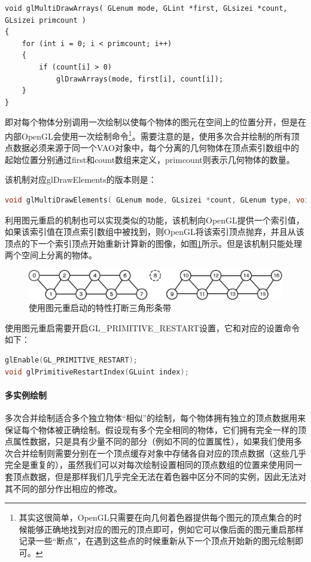 \begin{lstlisting}
void glMultiDrawArrays( GLenum mode, GLint *first, GLsizei *count, GLsizei primcount )
{
	for (int i = 0; i < primcount; i++)
	{
		if (count[i] > 0)
			glDrawArrays(mode, first[i], count[i]);
	}
}
\end{lstlisting}

即对每个物体分别调用一次绘制以使每个物体的图元在空间上的位置分开，但是在内部OpenGL会使用一次绘制命令\footnote{其实这很简单，OpenGL只需要在向几何着色器提供每个图元的顶点集合的时候能够正确地找到对应的图元的顶点即可，例如它可以像后面的图元重启那样记录一些“断点”，在遇到这些点的时候重新从下一个顶点开始新的图元绘制即可。}。需要注意的是，使用多次合并绘制的所有顶点数据必须来源于同一个VAO对象中，每个分离的几何物体在顶点索引数组中的起始位置分别通过first和count数组来定义，primcount则表示几何物体的数量。

该机制对应glDrawElements的版本则是：

\begin{lstlisting}[language=C++]
void glMultiDrawElements​( GLenum mode​, GLsizei *count​, GLenum type​, void **indices​, GLsizei primcount​ );
\end{lstlisting}

利用图元重启的机制也可以实现类似的功能，该机制向OpenGL提供一个索引值，如果该索引值在顶点索引数组中被找到，则OpenGL将该索引顶点抛弃，并且从该顶点的下一个索引顶点开始重新计算新的图像，如图\ref{f:api-primitive-restart}所示。但是该机制只能处理两个空间上分离的物体。

\begin{figure}
\includegraphics[width=\textwidth]{figures/api/primitive-restart}
	\caption{使用图元重启动的特性打断三角形条带}
	\label{f:api-primitive-restart}
\end{figure}

使用图元重启需要开启GL\_PRIMITIVE\_RESTART设置，它和对应的设置命令如下：

\begin{lstlisting}[language=C++]
glEnable(GL_PRIMITIVE_RESTART)​;
void glPrimitiveRestartIndex(GLuint index​);
\end{lstlisting}





\paragraph{多实例绘制}
多次合并绘制适合多个独立物体“相似”的绘制，每个物体拥有独立的顶点数据用来保证每个物体被正确绘制。假设现有多个完全相同的物体，它们拥有完全一样的顶点属性数据，只是具有少量不同的部分（例如不同的位置属性），如果我们使用多次合并绘制则需要分别在一个顶点缓存对象中存储各自对应的顶点数据（这些几乎完全是重复的），虽然我们可以对每次绘制设置相同的顶点数组的位置来使用同一套顶点数据，但是那样我们几乎完全无法在着色器中区分不同的实例，因此无法对其不同的部分作出相应的修改。

